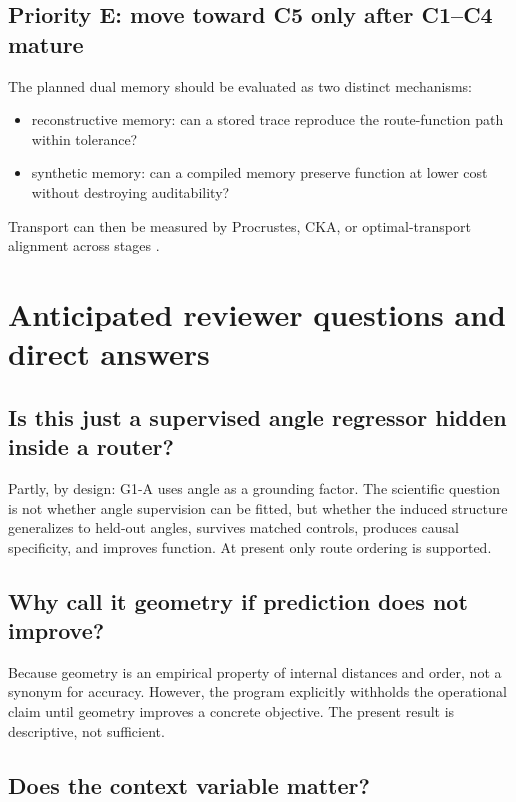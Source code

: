 \documentclass[11pt,a4paper]{article}
\begin{document}
\subsection{Priority E: move toward C5 only after C1--C4 mature}

The planned dual memory should be evaluated as two distinct mechanisms:

\begin{itemize}
\item reconstructive memory: can a stored trace reproduce the route-function path within tolerance?
\item synthetic memory: can a compiled memory preserve function at lower cost without destroying auditability?
\end{itemize}

Transport can then be measured by Procrustes, CKA, or optimal-transport alignment across stages \citep{kornblith2019cka,peyre2019ot,singh2020otfusion}.

\section{Anticipated reviewer questions and direct answers}

\subsection*{Is this just a supervised angle regressor hidden inside a router?}

Partly, by design: G1-A uses angle as a grounding factor. The scientific question is not whether angle supervision can be fitted, but whether the induced structure generalizes to held-out angles, survives matched controls, produces causal specificity, and improves function. At present only route ordering is supported.

\subsection*{Why call it geometry if prediction does not improve?}

Because geometry is an empirical property of internal distances and order, not a synonym for accuracy. However, the program explicitly withholds the operational claim until geometry improves a concrete objective. The present result is descriptive, not sufficient.

\subsection*{Does the context variable matter?}
\end{document}
